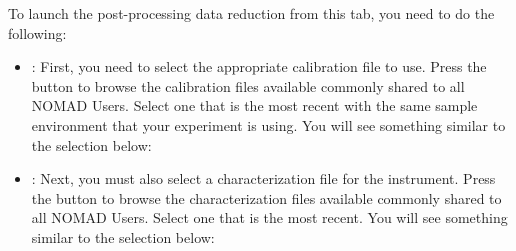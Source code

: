 To launch the post-processing data reduction from this tab, you need to do the following:

\begin{itemize}

\item {}: First, you need to select the appropriate calibration file to use. Press the  button to browse the calibration files available commonly shared to all NOMAD Users. Select one that is the most recent with the same sample environment that your experiment is using. You will see something similar to the selection below:

\noindent{}

\item {}: Next, you must also select a characterization file for the instrument. Press the  button to browse the characterization files available commonly shared to all NOMAD Users. Select one that is the most recent. You will see something similar to the selection below:

\noindent{}


\end{itemize}

